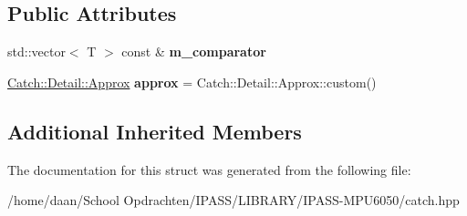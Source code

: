 \subsection*{Public Attributes}
\begin{DoxyCompactItemize}
\item 
\mbox{\label{structCatch_1_1Matchers_1_1Vector_1_1ApproxMatcher_a1394b5913d30bdd1147e1941fc41af56}} 
std\+::vector$<$ T $>$ const  \& {\bfseries m\+\_\+comparator}
\item 
\mbox{\label{structCatch_1_1Matchers_1_1Vector_1_1ApproxMatcher_a5515447af58adb5dc48a5d300b9ae162}} 
\hyperlink{classCatch_1_1Detail_1_1Approx}{Catch\+::\+Detail\+::\+Approx} {\bfseries approx} = Catch\+::\+Detail\+::\+Approx\+::custom()
\end{DoxyCompactItemize}
\subsection*{Additional Inherited Members}


The documentation for this struct was generated from the following file\+:\begin{DoxyCompactItemize}
\item 
/home/daan/\+School Opdrachten/\+I\+P\+A\+S\+S/\+L\+I\+B\+R\+A\+R\+Y/\+I\+P\+A\+S\+S-\/\+M\+P\+U6050/catch.\+hpp\end{DoxyCompactItemize}
